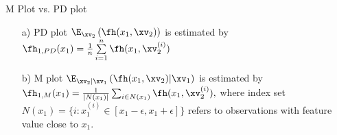 \documentclass[11pt,compress,t,notes=noshow, aspectratio=169, xcolor=table]{beamer}
\begin{document}
\begin{frame}{M Plot vs. PD plot}
\begin{enumerate}[<+->]
\item[a)] PD plot $\E_{\xv_2} \left( \fh(x_1, \xv_2) \right)$ is estimated by $ \fh_{1, PD}(x_1) = \frac{1}{n} \sum\limits_{i=1}^n \fh(x_1, \xv_2^{(i)})$
\item[b)] M plot $\E_{\xv_2|\xv_1} \left( \fh(x_1, \xv_2) \middle| \xv_1\right)$ is
estimated by $\fh_{1, M}(x_1) = \textstyle\frac{1}{|N(x_1)|} \sum_{i \in N(x_1)} \fh(x_1, \xv_2^{(i)}),$
where index set $N(x_1) = \{i: x_1^{(i)} \in [x_1 - \epsilon, x_1 + \epsilon]\}$ refers to observations with feature value close to $x_1$. %
\end{enumerate}
\end{frame}
\end{document}
